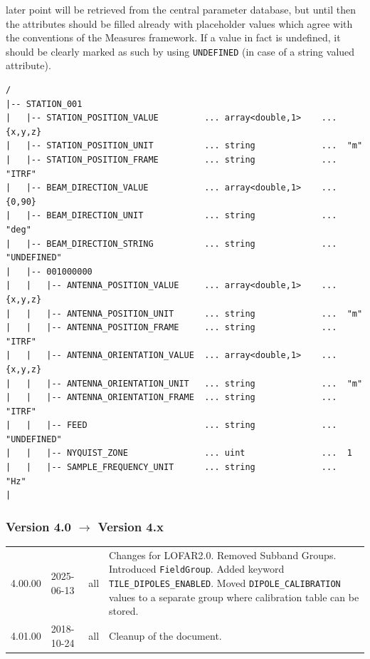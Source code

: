 \documentclass[a4paper,10pt,bibtotoc]{scrartcl}
\begin{document}
\begin{enumerate}
  later point will be retrieved from the central parameter database, but until then
  the attributes should be filled already with placeholder values which agree with
  the conventions of the Measures framework. If a value in fact is undefined, it
  should be clearly marked as such by using \verb|UNDEFINED| (in case of a string
  valued attribute).
  {\small
\begin{verbatim}
/
|-- STATION_001
|   |-- STATION_POSITION_VALUE         ... array<double,1>    ...  {x,y,z}
|   |-- STATION_POSITION_UNIT          ... string             ...  "m"
|   |-- STATION_POSITION_FRAME         ... string             ...  "ITRF"
|   |-- BEAM_DIRECTION_VALUE           ... array<double,1>    ...  {0,90}
|   |-- BEAM_DIRECTION_UNIT            ... string             ...  "deg"
|   |-- BEAM_DIRECTION_STRING          ... string             ...  "UNDEFINED"
|   |-- 001000000
|   |   |-- ANTENNA_POSITION_VALUE     ... array<double,1>    ...  {x,y,z}
|   |   |-- ANTENNA_POSITION_UNIT      ... string             ...  "m"
|   |   |-- ANTENNA_POSITION_FRAME     ... string             ...  "ITRF"
|   |   |-- ANTENNA_ORIENTATION_VALUE  ... array<double,1>    ...  {x,y,z}
|   |   |-- ANTENNA_ORIENTATION_UNIT   ... string             ...  "m"
|   |   |-- ANTENNA_ORIENTATION_FRAME  ... string             ...  "ITRF"
|   |   |-- FEED                       ... string             ...  "UNDEFINED"
|   |   |-- NYQUIST_ZONE               ... uint               ...  1
|   |   |-- SAMPLE_FREQUENCY_UNIT      ... string             ...  "Hz"
|
\end{verbatim}}
\end{enumerate}




\subsubsection*{Version 4.0 $\rightarrow$ Version 4.x}

\begin{center}
  \tablelasttail{\hline}
  \begin{supertabular}{lllp{9.5cm}}
    4.00.00 & 2025-06-13 & all   & Changes for LOFAR2.0. Removed Subband Groups. Introduced \texttt{FieldGroup}. Added keyword \texttt{TILE\_DIPOLES\_ENABLED}. Moved \texttt{DIPOLE\_CALIBRATION} values to a separate group where calibration table can be stored. \\
    4.01.00 & 2018-10-24 & all   & Cleanup of the document. \\
 \end{supertabular}
\end{center}
\end{document}
